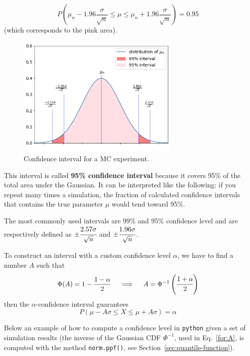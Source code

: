 \begin{equation}
P\left(\mu_n - 1.96\frac{\sigma}{\sqrt{n}}\le \mu \le \mu_n + 1.96\frac{\sigma}{\sqrt{n}}\right) = 0.95
\end{equation}
(which corresponds to the pink area).

\begin{figure}[htb]
\centering
\includegraphics[width=0.7\textwidth]{figures/confidence_interval}
\caption{Confidence interval for a MC experiment.}
\label{fig:confidence_interval}
\end{figure}

This interval is called \textbf{95\% confidence interval} because it covers 95\% of the total area under the Gaussian. It can be interpreted like the following: if you repeat many times a simulation, the fraction of calculated confidence intervals that contains the true parameter $\mu$ would tend toward 95\%.

The most commonly used intervals are 99\% and 95\% confidence level and are respectively defined as \(\pm \cfrac{2.57\sigma}{\sqrt{n}}\) and \(\pm \cfrac{1.96\sigma}{\sqrt{n}}\).

To construct an interval with a custom confidence level $\alpha$, we have to find a number $A$ such that
\begin{equation}
\Phi(A) = 1 - \frac{1-\alpha}{2}\quad\implies\quad A = \Phi^{-1}\left(\cfrac{1+\alpha}{2}\right)
\label{for:A}
\end{equation}
then the $\alpha$-confidence interval guarantees
\begin{equation}
P(\mu - A\sigma \le X \le \mu+ A\sigma) = \alpha 
\end{equation}

Below an example of how to compute a confidence level in \texttt{python} given a set of simulation results (the inverse of the Gaussian CDF $\Phi^{-1}$, used in Eq.~\ref{for:A}, is computed with the method \texttt{norm.ppf()}, see Section~\ref{sec:quantile-function}).


